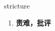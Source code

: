 
\begin{frame}
{\huge stricture}
\begin{center}
\begin{enumerate}\Large
  \item \textbf{责难，批评}
\end{enumerate}
\end{center}
\end{frame}
